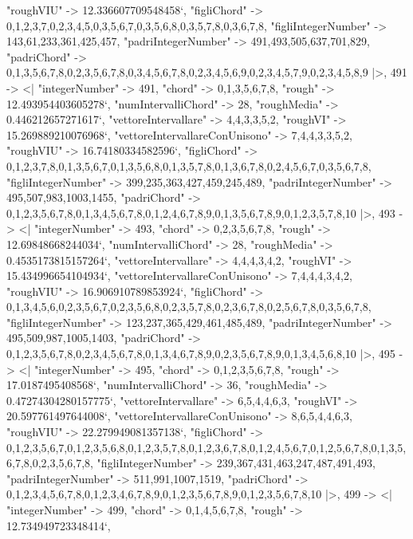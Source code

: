 \documentclass[
]{article}
\begin{document}
\begin{DatasetVerbatim}
    "roughVIU" -> 12.336607709548458`,
    "figliChord" -> {{0,1,2,3,7},{0,2,3,4,5},{0,3,5,6,7},{0,3,5,6,8},{0,3,5,7,8},{0,3,6,7,8}},
    "figliIntegerNumber" -> {143,61,233,361,425,457},
    "padriIntegerNumber" -> {491,493,505,637,701,829},
    "padriChord" -> {{0,1,3,5,6,7,8},{0,2,3,5,6,7,8},{0,3,4,5,6,7,8},{0,2,3,4,5,6,9},{0,2,3,4,5,7,9},{0,2,3,4,5,8,9}}
  |>,
  491 -> <|
    "integerNumber" -> 491,
    "chord" -> {0,1,3,5,6,7,8},
    "rough" -> 12.493954403605278`,
    "numIntervalliChord" -> 28,
    "roughMedia" -> 0.446212657271617`,
    "vettoreIntervallare" -> {4,4,3,3,5,2},
    "roughVI" -> 15.269889210076968`,
    "vettoreIntervallareConUnisono" -> {7,4,4,3,3,5,2},
    "roughVIU" -> 16.74180334582596`,
    "figliChord" -> {{0,1,2,3,7,8},{0,1,3,5,6,7},{0,1,3,5,6,8},{0,1,3,5,7,8},{0,1,3,6,7,8},{0,2,4,5,6,7},{0,3,5,6,7,8}},
    "figliIntegerNumber" -> {399,235,363,427,459,245,489},
    "padriIntegerNumber" -> {495,507,983,1003,1455},
    "padriChord" -> {{0,1,2,3,5,6,7,8},{0,1,3,4,5,6,7,8},{0,1,2,4,6,7,8,9},{0,1,3,5,6,7,8,9},{0,1,2,3,5,7,8,10}}
  |>,
  493 -> <|
    "integerNumber" -> 493,
    "chord" -> {0,2,3,5,6,7,8},
    "rough" -> 12.69848668244034`,
    "numIntervalliChord" -> 28,
    "roughMedia" -> 0.4535173815157264`,
    "vettoreIntervallare" -> {4,4,4,3,4,2},
    "roughVI" -> 15.434996654104934`,
    "vettoreIntervallareConUnisono" -> {7,4,4,4,3,4,2},
    "roughVIU" -> 16.906910789853924`,
    "figliChord" -> {{0,1,3,4,5,6},{0,2,3,5,6,7},{0,2,3,5,6,8},{0,2,3,5,7,8},{0,2,3,6,7,8},{0,2,5,6,7,8},{0,3,5,6,7,8}},
    "figliIntegerNumber" -> {123,237,365,429,461,485,489},
    "padriIntegerNumber" -> {495,509,987,1005,1403},
    "padriChord" -> {{0,1,2,3,5,6,7,8},{0,2,3,4,5,6,7,8},{0,1,3,4,6,7,8,9},{0,2,3,5,6,7,8,9},{0,1,3,4,5,6,8,10}}
  |>,
  495 -> <|
    "integerNumber" -> 495,
    "chord" -> {0,1,2,3,5,6,7,8},
    "rough" -> 17.0187495408568`,
    "numIntervalliChord" -> 36,
    "roughMedia" -> 0.47274304280157775`,
    "vettoreIntervallare" -> {6,5,4,4,6,3},
    "roughVI" -> 20.597761497644008`,
    "vettoreIntervallareConUnisono" -> {8,6,5,4,4,6,3},
    "roughVIU" -> 22.279949081357138`,
    "figliChord" -> {{0,1,2,3,5,6,7},{0,1,2,3,5,6,8},{0,1,2,3,5,7,8},{0,1,2,3,6,7,8},{0,1,2,4,5,6,7},{0,1,2,5,6,7,8},{0,1,3,5,6,7,8},{0,2,3,5,6,7,8}},
    "figliIntegerNumber" -> {239,367,431,463,247,487,491,493},
    "padriIntegerNumber" -> {511,991,1007,1519},
    "padriChord" -> {{0,1,2,3,4,5,6,7,8},{0,1,2,3,4,6,7,8,9},{0,1,2,3,5,6,7,8,9},{0,1,2,3,5,6,7,8,10}}
  |>,
  499 -> <|
    "integerNumber" -> 499,
    "chord" -> {0,1,4,5,6,7,8},
    "rough" -> 12.734949723348414`,

\end{DatasetVerbatim}
\end{document}
